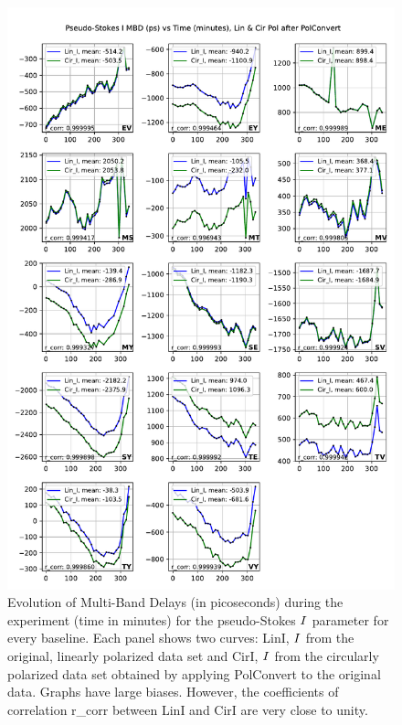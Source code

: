 \documentclass[letterpaper,twoside,12pt]{article}
\begin{document}
\begin{figure}[ht!]
  \begin{center}
  \includegraphics[width=33pc]{MBD_Lin_I_and_Cir_I.pdf}
  \caption{\small Evolution of Multi-Band Delays (in picoseconds) during the experiment (time in minutes) for the pseudo-Stokes $\protect I$ parameter for every baseline. Each panel shows two curves: LinI, $\protect I$ from the original, linearly polarized data set and CirI, $\protect I$ from the circularly polarized data set obtained by applying PolConvert to the original data. Graphs have large biases. However, the coefficients of correlation r\_corr between LinI and CirI are very close to unity.}
  \label{mbd_lin_and_cir}
  \end{center}
\end{figure}
\end{document}

